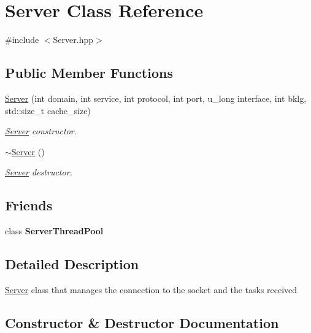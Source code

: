 \hypertarget{classServer}{}\section{Server Class Reference}
\label{classServer}


{\ttfamily \#include $<$Server.\+hpp$>$}

\subsection*{Public Member Functions}
\begin{DoxyCompactItemize}
\item 
\hyperlink{classServer_abc46ac7076bfd95da8b3b3bf73e687f7}{Server} (int domain, int service, int protocol, int port, u\+\_\+long interface, int bklg, std\+::size\+\_\+t cache\+\_\+size)
\begin{DoxyCompactList}\small\item\em \hyperlink{classServer}{Server} constructor. \end{DoxyCompactList}\item 
\mbox{\label{classServer_a4b3aa2579cb1c8cd1d069582c14d0fa6}} 
\hyperlink{classServer_a4b3aa2579cb1c8cd1d069582c14d0fa6}{$\sim$\+Server} ()
\begin{DoxyCompactList}\small\item\em \hyperlink{classServer}{Server} destructor. \end{DoxyCompactList}\end{DoxyCompactItemize}
\subsection*{Friends}
\begin{DoxyCompactItemize}
\item 
\mbox{\label{classServer_ae57da46723e205970eb7acde627edb19}} 
class {\bfseries Server\+Thread\+Pool}
\end{DoxyCompactItemize}


\subsection{Detailed Description}
\hyperlink{classServer}{Server} class that manages the connection to the socket and the tasks received 

\subsection{Constructor \& Destructor Documentation}
\mbox{\label{classServer_abc46ac7076bfd95da8b3b3bf73e687f7}} 
